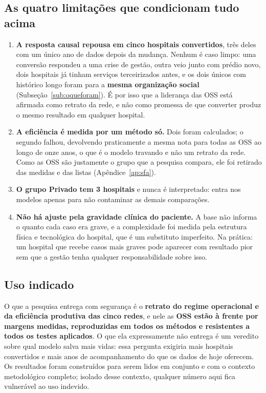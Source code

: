 \subsection*{As quatro limitações que condicionam tudo acima}
\begin{enumerate}[nosep,leftmargin=*]
\item \textbf{A resposta causal repousa em cinco hospitais convertidos},
  três deles com um único ano de dados depois da mudança. Nenhum é caso
  limpo: uma conversão respondeu a uma crise de gestão, outra veio junto
  com prédio novo, dois hospitais já tinham serviços terceirizados antes,
  e os dois únicos com histórico longo foram para a \textbf{mesma
  organização social} (Subseção~\ref{sub:oqueforam}). É por isso que a
  liderança das OSS está afirmada como retrato da rede, e não como
  promessa de que converter produz o mesmo resultado em qualquer hospital.
\item \textbf{A eficiência é medida por um método só.} Dois foram
  calculados; o segundo falhou, devolvendo praticamente a mesma nota para
  todas as OSS ao longo de onze anos, o que é o modelo travando e não um
  retrato da rede. Como as OSS são justamente o grupo que a pesquisa
  compara, ele foi retirado das medidas e das listas
  (Apêndice~\ref{ap:sfa}).
\item \textbf{O grupo Privado tem 3 hospitais} e nunca é interpretado:
  entra nos modelos apenas para não contaminar as demais comparações.
\item \textbf{Não há ajuste pela gravidade clínica do paciente.} A base
  não informa o quanto cada caso era grave, e a complexidade foi medida
  pela estrutura física e tecnológica do hospital, que é um substituto
  imperfeito. Na prática: um hospital que recebe casos mais graves pode
  aparecer com resultado pior sem que a gestão tenha qualquer
  responsabilidade sobre isso.
\end{enumerate}

\subsection*{Uso indicado}

\noindent O que a pesquisa entrega com segurança é o \textbf{retrato do
regime operacional e da eficiência produtiva das cinco redes}, e nele as
\textbf{OSS estão à frente por margens medidas, reproduzidas em todos os
métodos e resistentes a todos os testes aplicados}. O que ela
expressamente não entrega é um veredito sobre qual modelo salva mais
vidas: essa pergunta exigiria mais hospitais convertidos e mais anos de
acompanhamento do que os dados de hoje oferecem. Os resultados foram
construídos para serem lidos em conjunto e com o contexto metodológico
completo; isolado desse contexto, qualquer número aqui fica vulnerável ao
uso indevido.
